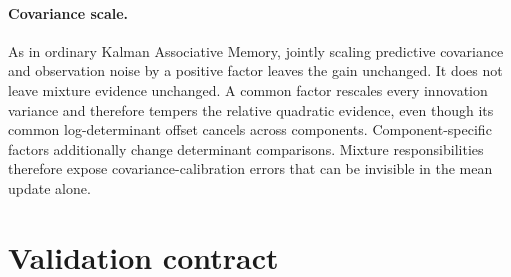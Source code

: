\documentclass[11pt]{article}
\begin{document}
\paragraph{Covariance scale.}
As in ordinary Kalman Associative Memory, jointly scaling predictive covariance and observation
noise by a positive factor leaves the gain unchanged.  It does not leave mixture evidence
unchanged.  A common factor rescales every innovation variance and therefore tempers the relative
quadratic evidence, even though its common log-determinant offset cancels across components.
Component-specific factors additionally change determinant comparisons.  Mixture responsibilities
therefore expose covariance-calibration errors that can be invisible in the mean update alone.

\section{Validation contract}
\label{sec:kdn3-validation}
\end{document}
